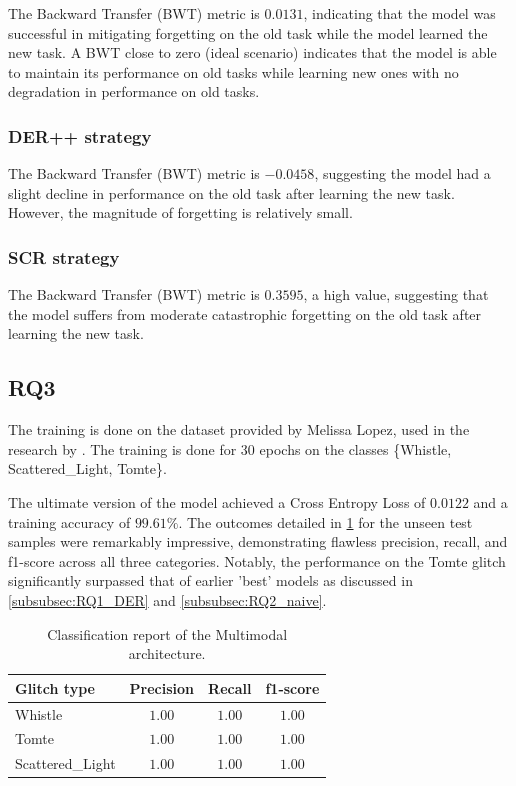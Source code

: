 The Backward Transfer (BWT) metric is $0.0131$, indicating that the model was successful in mitigating forgetting on the old task while the model learned the new task. A BWT close to zero (ideal scenario) indicates that the model is able to maintain its performance on old tasks while learning new ones with no degradation in performance on old tasks.\\

\subsubsection{DER++ strategy}
\label{subsubsec:RQ2_der++}

The Backward Transfer (BWT) metric is $-0.0458$, suggesting the model had a slight decline in performance on the old task after learning the new task. However, the magnitude of forgetting is relatively small. 


\subsubsection{SCR strategy}
\label{subsubsec:RQ2_scr}

The Backward Transfer (BWT) metric is $0.3595$, a high value, suggesting that the model suffers from moderate catastrophic forgetting on the old task after learning the new task.  

\newpage

\subsection{RQ3}
The training is done on the dataset provided by Melissa Lopez, used in the research by \citep{laguarta2023detection, dooney2022dvgan, dooney2024cdvgan}. The training is done for 30 epochs on the classes \{Whistle, Scattered\_Light, Tomte\}. 

The ultimate version of the model achieved a Cross Entropy Loss of $0.0122$ and a training accuracy of $99.61\%$. The outcomes detailed in \ref{tbl:RQ3_class_report_multimodal} for the unseen test samples were remarkably impressive, demonstrating flawless precision, recall, and f1-score across all three categories. Notably, the performance on the Tomte glitch significantly surpassed that of earlier 'best' models as discussed in \ref{subsubsec:RQ1_DER} and \ref{subsubsec:RQ2_naive}.

\begin{table}[ht]
\centering
    \begin{tabular}{|l|c c c|}
    \hline
    \textbf{Glitch type} & \textbf{Precision} & \textbf{Recall} & \textbf{f1-score} \\ \hline
    Whistle & $1.00$ & $1.00$ & $1.00$ \\
    Tomte & $1.00$ & $1.00$ & $1.00$ \\
    Scattered\_Light & $1.00$ & $1.00$ & $1.00$ \\
    \hline
    \end{tabular}
    \caption{Classification report of the Multimodal architecture.}
    \label{tbl:RQ3_class_report_multimodal}
\end{table}


